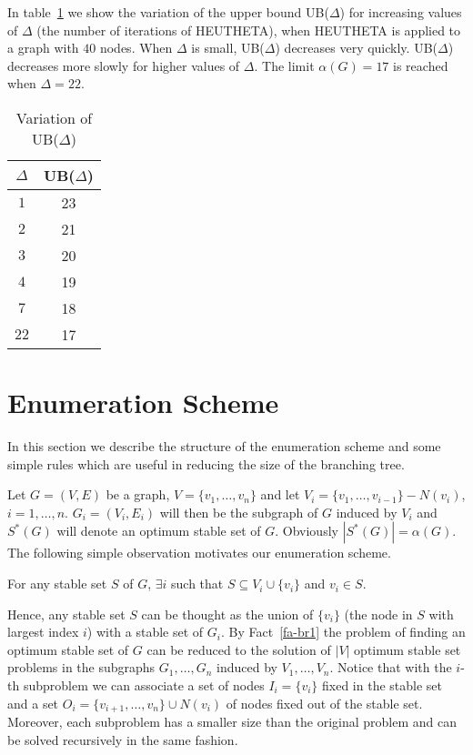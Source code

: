 In table~\ref{ta-var} we show the variation of the upper
bound UB($\Delta$) for increasing values of $\Delta$  (the number of
iterations of  HEUTHETA), when  HEUTHETA is applied to a
graph with $40$ nodes.  When $\Delta$ is
small, UB($\Delta$) decreases very quickly. UB($\Delta$) decreases
more slowly for higher values of  $\Delta$. The limit $\alpha(G)=17$
is reached when $\Delta=22$. 

\begin{table} 
\caption{Variation of UB($\Delta$)}
\label{ta-var}
\begin{center}
\begin{tabular}{||c|c|} \hline
    $\Delta$      &UB($\Delta$) \\ 
\hline    
    $1$           &23     \\ 
    $2$           &21     \\ 
    $3$           &20     \\ 
    $4$           &19     \\ 
    $7$           &18     \\ 
    $22$          &17     \\ 
  \hline 
\end{tabular}
\end{center}
\end{table}


\def\balf{{\bar \alpha}}
\section{Enumeration Scheme}
\label{Se-Branch}

In this section we describe the structure of the enumeration scheme
and some simple rules which are useful in reducing the size of the
branching tree. 

   Let $G=(V,E)$ be a graph, $V = \{v_1, \dots, v_n\}$ and let $V_i =
\{ v_1, \dots, v_{i-1} \} - N(v_i)$,  $i=1,\dots,n$.
$G_i=(V_i,E_i)$ will then be the subgraph of $G$ induced by $V_i$
and $S^*(G)$ will denote an optimum stable set of $G$. Obviously
$|S^*(G)| = \alpha(G)$. The following simple observation motivates
our enumeration scheme.

\begin {fact} 
\label{fa-br1} 
 For any stable set $S$ of $G$, $\exists i$  such that $S  \subseteq
V_i \cup \{v_i\}$ and $v_i \in S$. 
\end {fact}

Hence, any stable set $S$ can be thought as the union of $\{v_i\}$
(the node in $S$ with largest index $i$) with a stable set of $G_i$.
By Fact~\ref{fa-br1}  the problem of finding an optimum stable set of
$G$ can be  reduced to the solution of $|V|$ optimum stable set
problems in the  subgraphs $G_1, \dots, G_n$ induced by $V_1, \dots,
V_n$. Notice that with the $i$-th subproblem we can associate a set
of nodes $ I_i = \{v_i\}$ fixed in the stable set and a set $O_i =
\{v_{i+1},\dots,v_n\} \cup N(v_i)$ of nodes fixed out of the
stable set. Moreover, each subproblem  has a smaller size than the
original problem and can be  solved recursively in the same fashion. 

